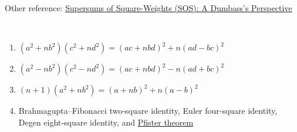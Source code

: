 \documentclass{treatise}
\begin{document}
\begin{shaded}
\begin{theorem}
\begin{enumerate}
\end{enumerate}
Other reference: \href{https://web.evanchen.cc/handouts/SOS_Dumbass/SOS_Dumbass.pdf}{Supersums of Square-Weights (SOS): A Dumbass’s Perspective}
\end{theorem}
\begin{theorem}
\end{theorem}
\begin{proposition} \ 
\begin{enumerate}
	\item $(a^2 + n b^2) (c^2 + n d^2) = (ac + n bd)^2 + n (ad - bc)^2$
	\item $(a^2 - n b^2) (c^2 - n d^2) = (ac + n bd)^2 - n (ad + bc)^2$
	\item $(n + 1) (a^2 + n b^2) = (a + n b)^2 + n (a - b)^2$
	\item Brahmagupta–Fibonacci two-square identity, Euler four-square identity, Degen eight-square identity, and \href{https://kconrad.math.uconn.edu/blurbs/linmultialg/pfister.pdf}{Pfister theorem}
\end{enumerate}
\end{proposition}


\end{shaded}
\end{document}

